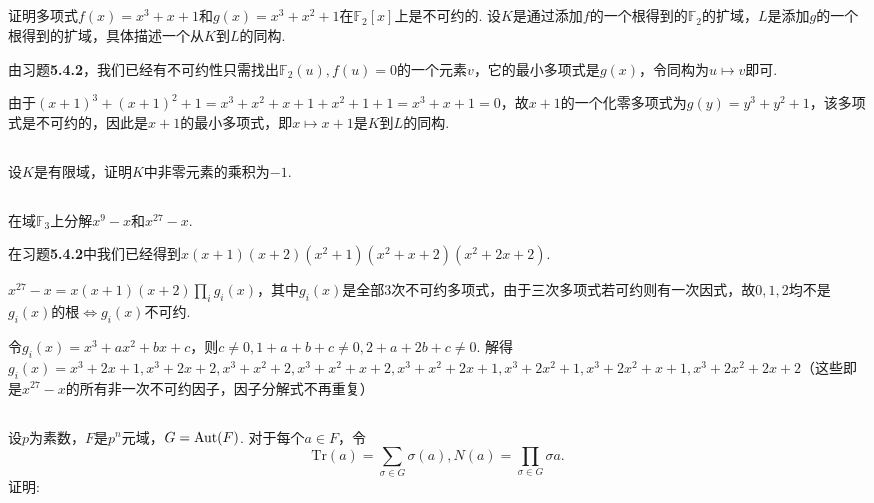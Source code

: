 \subsection{}
证明多项式$f(x)=x^3+x+1$和$g(x)=x^3+x^2+1$在$\mathbb{F}_2[x]$上是不可约的. 设$K$是通过添加$f$的一个根得到的$\mathbb{F}_2$的扩域，$L$是添加$g$的一个根得到的扩域，具体描述一个从$K$到$L$的同构.

\jie 由{\heiti 习题}\textbf{5.4.2}，我们已经有不可约性只需找出$\mathbb{F}_2(u), f(u)=0$的一个元素$v$，它的最小多项式是$g(x)$，令同构为$u\mapsto v$即可.

由于$(x+1)^3+(x+1)^2+1=x^3+x^2+x+1+x^2+1+1=x^3+x+1=0$，故$x+1$的一个化零多项式为$g(y)=y^3+y^2+1$，该多项式是不可约的，因此是$x+1$的最小多项式，即$x\mapsto x+1$是$K$到$L$的同构.

\subsection{}
设$K$是有限域，证明$K$中非零元素的乘积为$-1$.


\subsection{}
在域$\mathbb{F}_3$上分解$x^9-x$和$x^{27}-x$.

\jie 在{\heiti 习题}\textbf{5.4.2}中我们已经得到$x(x+1)(x+2)(x^2+1)(x^2+x+2)(x^2+2x+2)$.

$x^{27}-x=x(x+1)(x+2)\prod_ig_i(x)$，其中$g_i(x)$是全部$3$次不可约多项式，由于三次多项式若可约则有一次因式，故$0,1,2$均不是$g_i(x)$的根$\Leftrightarrow g_i(x)$不可约.

令$g_i(x)=x^3+ax^2+bx+c$，则$c\neq 0, 1+a+b+c\neq 0, 2+a+2b+c\neq 0$. 解得$g_i(x)=x^3+2x+1, x^3+2x+2, x^3+x^2+2, x^3+x^2+x+2, x^3+x^2+2x+1, x^3+2x^2+1, x^3+2x^2+x+1, x^3+2x^2+2x+2$（这些即是$x^{27}-x$的所有非一次不可约因子，因子分解式不再重复）

\subsection{}
设$p$为素数，$F$是$p^n$元域，$G=\operatorname{Aut}(F)$. 对于每个$a\in F$，令
$$\mathrm{Tr}(a)=\sum_{\sigma\in G}\sigma(a), N(a)=\prod_{\sigma\in G}\sigma{a}.$$
证明:

